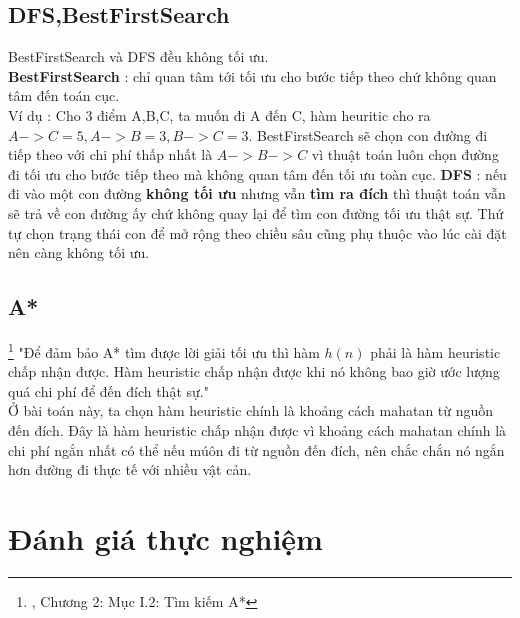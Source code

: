 \documentclass[11pt]{article} %
\begin{document}
\subsection{DFS,BestFirstSearch}
BestFirstSearch và DFS đều không tối ưu.\\
\textbf{BestFirstSearch} : chỉ quan tâm tới tối ưu cho bước tiếp theo chứ không quan tâm đến toán cục.\\
Ví dụ : Cho 3 điểm A,B,C, ta muốn đi A đến C, hàm heuritic cho ra $A->C = 5, A->B = 3, B->C = 3$. BestFirstSearch sẽ chọn con đường đi tiếp theo với chi phí thấp nhất là $A->B->C$ vì thuật toán luôn chọn đường đi tối ưu cho bước tiếp theo mà không quan tâm đến tối ưu toàn cục.
\textbf{DFS} : nếu đi vào một con đường \textbf{không tối ưu} nhưng vẫn \textbf{tìm ra đích} thì thuật toán vẫn sẽ trả về con đường ấy chứ không quay lại để tìm con đường tối ưu thật sự. Thứ tự chọn trạng thái con để mở rộng theo chiều sâu cũng phụ thuộc vào lúc cài đặt nên càng không tối ưu.\\
\subsection{A*}
\footnote{\cite{csttnt_lhb}, Chương 2: Mục I.2: Tìm kiếm A*} "Để đảm bảo A* tìm được lời giải tối ưu thì hàm $h(n)$ phải là hàm heuristic chấp nhận được. Hàm heuristic chấp nhận được khi nó không bao giờ ước lượng quá chi phí để đến đích thật sự."\\
Ở bài toán này, ta chọn hàm heuristic chính là khoảng cách mahatan từ nguồn đến đích. Đây là hàm heuristic chấp nhận được vì khoảng cách mahatan chính là chi phí ngắn nhất có thể nếu múôn đi từ nguồn đến đích, nên chắc chắn nó ngắn hơn đường đi thực tế với nhiều vật cản.\\
\newpage
\subsection{}
\section{Đánh giá thực nghiệm}
\end{document}
